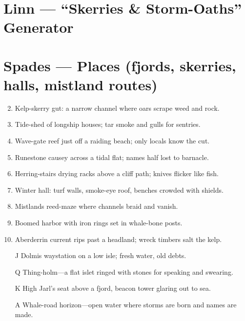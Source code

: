 \section{Linn --- ``Skerries \& Storm-Oaths'' Generator}
\label{chap:linn}

\section*{Spades --- Places (fjords, skerries, halls, mistland routes)}
\label{sec:linn-places}
\begin{enumerate}
\setcounter{enumi}{1}
\item Kelp-skerry gut: a narrow channel where oars scrape weed and rock.
\item Tide-shed of longship houses; tar smoke and gulls for sentries.
\item Wave-gate reef just off a raiding beach; only locals know the cut.
\item Runestone causey across a tidal flat; names half lost to barnacle.
\item Herring-stairs drying racks above a cliff path; knives flicker like fish.
\item Winter hall: turf walls, smoke-eye roof, benches crowded with shields.
\item Mistlands reed-maze where channels braid and vanish.
\item Boomed harbor with iron rings set in whale-bone posts.
\item Aberderrin current rips past a headland; wreck timbers salt the kelp.
\item[J] Dolmis waystation on a low isle; fresh water, old debts.
\item[Q] Thing-holm---a flat islet ringed with stones for speaking and swearing.
\item[K] High Jarl's seat above a fjord, beacon tower glaring out to sea.
\item[A] Whale-road horizon---open water where storms are born and names are made.
\end{enumerate}

